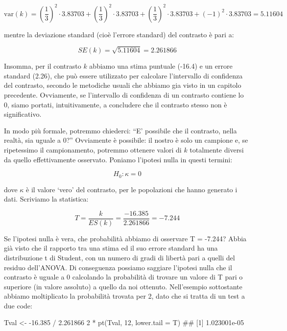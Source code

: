 \documentclass[a4paper,12pt,oneside]{book}
\newenvironment{Shaded}{\begin{snugshade}}{\end{snugshade}}
\newcommand{\DecValTok}[1]{#1}
\newcommand{\FloatTok}[1]{#1}
\newcommand{\SpecialCharTok}[1]{#1}
\newcommand{\DocumentationTok}[1]{#1}
\newcommand{\OtherTok}[1]{#1}
\newcommand{\FunctionTok}[1]{#1}
\newcommand{\AttributeTok}[1]{#1}
\newcommand{\NormalTok}[1]{#1}
\begin{document}
\[\textrm{var}(k) = \left( \frac{1}{3} \right)^2 \cdot 3.83703  +  \left( \frac{1}{3}\right)^2 \cdot 3.83703 + \left( \frac{1}{3}  \right)^2 \cdot 3.83703 + \left( - 1 \right)^2 \cdot 3.83703  = 5.11604\]

mentre la deviazione standard (cioè l'errore standard) del contrasto è pari a:

\[ SE(k) = \sqrt{5.11604} = 2.261866\]

Insomma, per il contrasto \(k\) abbiamo una stima puntuale (-16.4) e un errore standard (2.26), che può essere utilizzato per calcolare l'intervallo di confidenza del contrasto, secondo le metodiche usuali che abbiamo gia visto in un capitolo precedente. Ovviamente, se l'intervallo di confidenza di un contrasto contiene lo 0, siamo portati, intuitivamente, a concludere che il contrasto stesso non è significativo.

In modo più formale, potremmo chiederci: ``E' possibile che il contrasto, nella realtà, sia uguale a 0?'' Ovviamente è possibile: il nostro è solo un campione e, se ripetessimo il campionamento, potremmo ottenere valori di \(k\) totalmente diversi da quello effettivamente osservato. Poniamo l'ipotesi nulla in questi termini:

\[H_0: \kappa = 0\]

dove \(\kappa\) è il valore `vero' del contrasto, per le popolazioni che hanno generato i dati. Scriviamo la statistica:

\[T = \frac{k}{ES(k)} = \frac{-16.385}{2.261866} = -7.244\]

Se l'ipotesi nulla è vera, che probabilità abbiamo di osservare T = -7.244? Abbia già visto che il rapporto tra una stima ed il suo errore standard ha una distribuzione t di Student, con un numero di gradi di libertà pari a quelli del residuo dell'ANOVA. Di conseguenza possiamo saggiare l'ipotesi nulla che il contrasto è uguale a 0 calcolando la probabilità di trovare un valore di T pari o superiore (in valore assoluto) a quello da noi ottenuto. Nell'esempio sottostante abbiamo moltiplicato la probabilità trovata per 2, dato che si tratta di un test a due code:

\begin{Shaded}
\begin{Highlighting}[]
\NormalTok{Tval }\OtherTok{\textless{}{-}} \SpecialCharTok{{-}}\FloatTok{16.385} \SpecialCharTok{/} \FloatTok{2.261866}
\DecValTok{2} \SpecialCharTok{*} \FunctionTok{pt}\NormalTok{(Tval, }\DecValTok{12}\NormalTok{, }\AttributeTok{lower.tail =}\NormalTok{ T)}
\DocumentationTok{\#\# [1] 1.023001e{-}05}
\end{Highlighting}
\end{Shaded}
\end{document}
